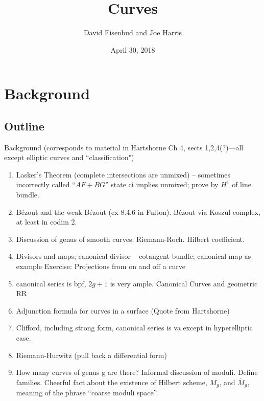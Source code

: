 \documentclass[12pt, leqno]{book}
\date{April 30, 2018}
\title{Curves}
\author{David Eisenbud and Joe Harris }
\begin{document}
\chapter{Background}
\section*{Outline}
 Background (corresponds to material in Hartshorne Ch 4, sects 1,2,4(?)---all except elliptic curves and ``classification")
\begin{enumerate}

\item Lasker's Theorem (complete intersections are unmixed) -- sometimes incorrectly called ``$AF+BG$''
state ci implies unmixed; prove by $H^1$ of line bundle.

\item B\'ezout and the  weak B\'ezout (ex 8.4.6 in Fulton).
B\'ezout via Koszul complex, at least in codim 2.

\item Discussion of genus of smooth curves. Riemann-Roch. Hilbert coefficient.

\item Divisors and maps; canonical divisor -- cotangent bundle; canonical map as example
Exercise: Projections from on and off a curve

\item canonical series is bpf, $2g+1$ is very ample. Canonical Curves and geometric RR

\item Adjunction formula for curves in a surface (Quote from Hartshorne)

\item Clifford, including strong form, canonical series is va except in hyperelliptic case.

\item Riemann-Hurwitz (pull back a differential form)

\item How many curves of genus g are there? Informal discussion of moduli. Define families. Cheerful fact about the existence of  Hilbert scheme, $M_g$, and $\overline M_g$, meaning of the phrase ``coarse moduli space''.

\end{enumerate}
\end{document}
